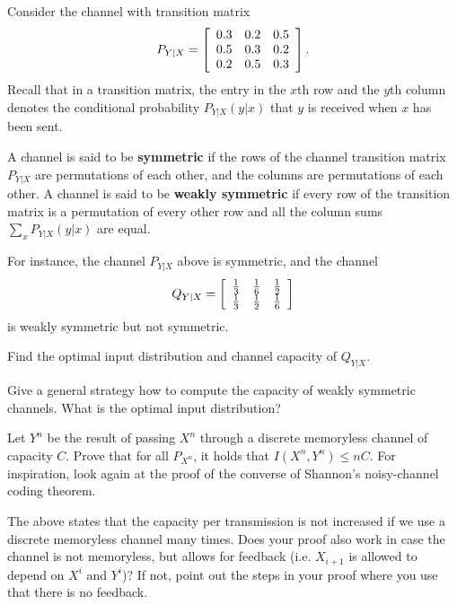 \documentclass[a4paper,10pt,landscape,twocolumn]{scrartcl}
\begin{document}
\begin{exercise}
Consider the channel with transition matrix
\[
P_{Y|X} = \left[
\begin{array}{c c c}
0.3&0.2&0.5\\
0.5&0.3&0.2\\
0.2&0.5&0.3
\end{array}
\right].
\]
Recall that in a transition matrix, the entry in the $x$th row and the $y$th column denotes the conditional probability $P_{Y|X}(y|x)$ that $y$ is received when $x$ has been sent.

A channel is said to be \textbf{symmetric} if the rows of the channel transition matrix $P_{Y|X}$ are permutations of each other, and the columns are permutations of each other. A channel is said to be \textbf{weakly symmetric} if every row of the transition matrix is a permutation of every other row and all the column sums $\sum_x P_{Y|X}(y|x)$ are equal.

For instance, the channel $P_{Y|X}$ above is symmetric, and the channel
\[
Q_{Y|X} = \left[
\begin{array}{c c c}
\frac{1}{3}&\frac{1}{6}&\frac{1}{2}\\
\frac{1}{3}&\frac{1}{2}&\frac{1}{6}
\end{array}
\right]
\]
is weakly symmetric but not symmetric.
	\begin{subex}
	Find the optimal input distribution and channel capacity of $Q_{Y|X}$.
	\end{subex}
	\begin{subex}
	Give a general strategy how to compute the capacity of weakly symmetric channels. What is the optimal input distribution?
	\end{subex}
\end{exercise}

\begin{exercise}
Let $Y^n$ be the result of passing $X^n$ through a discrete memoryless channel of capacity $C$. Prove that for all $P_{X^n}$, it holds that $I(X^n,Y^n) \leq nC$. For inspiration, look again at the proof of the converse of Shannon's noisy-channel coding theorem.

The above states that the capacity per transmission is not increased if we use a discrete memoryless channel many times. Does your proof also work in case the channel is not memoryless, but allows for feedback (i.e. $X_{i+1}$ is allowed to depend on $X^i$ and $Y^i$)? If not, point out the steps in your proof where you use that there is no feedback.
\end{exercise}
\end{document}
